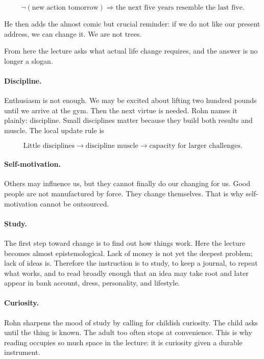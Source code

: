 \begin{equation}
\neg(\text{new action tomorrow}) \Longrightarrow \text{the next five years resemble the last five}.
\end{equation}

He then adds the almost comic but crucial reminder: if we do not like our present address, we can change it. We are not trees.

From here the lecture asks what actual life change requires, and the answer is no longer a slogan.

\paragraph{Discipline.} Enthusiasm is not enough. We may be excited about lifting two hundred pounds until we arrive at the gym. Then the next virtue is needed. Rohn names it plainly: discipline. Small disciplines matter because they build both results and muscle. The local update rule is

\begin{equation}
\text{Little disciplines} \to \text{discipline muscle} \to \text{capacity for larger challenges}.
\end{equation}

\paragraph{Self-motivation.} Others may influence us, but they cannot finally do our changing for us. Good people are not manufactured by force. They change themselves. That is why self-motivation cannot be outsourced.

\paragraph{Study.} The first step toward change is to find out how things work. Here the lecture becomes almost epistemological. Lack of money is not yet the deepest problem; lack of ideas is. Therefore the instruction is to study, to keep a journal, to repeat what works, and to read broadly enough that an idea may take root and later appear in bank account, dress, personality, and lifestyle.

\paragraph{Curiosity.} Rohn sharpens the mood of study by calling for childish curiosity. The child asks until the thing is known. The adult too often stops at convenience. This is why reading occupies so much space in the lecture: it is curiosity given a durable instrument.

